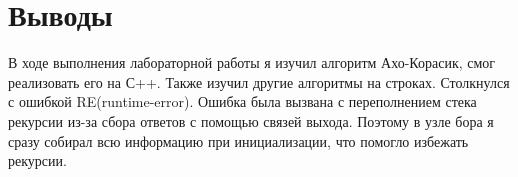 \section{Выводы}
В ходе выполнения лабораторной работы я изучил алгоритм Ахо-Корасик, смог реализовать его на С++.
Также изучил другие алгоритмы на строках. Столкнулся с ошибкой RE(runtime-error). Ошибка была вызвана с переполнением стека рекурсии из-за сбора ответов с помощью связей выхода.
Поэтому в узле бора я сразу собирал всю информацию при инициализации, что помогло избежать рекурсии.
\pagebreak
